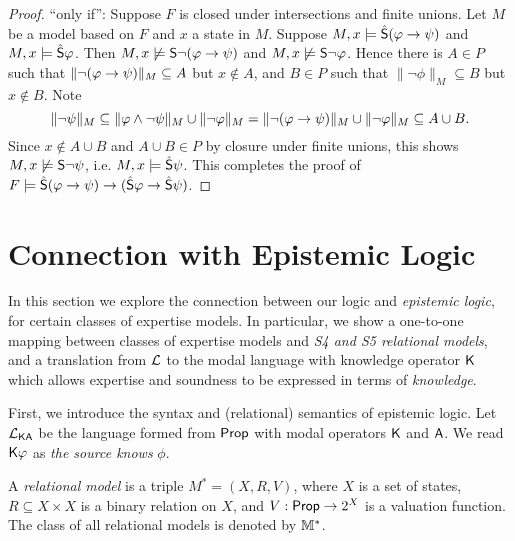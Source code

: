 \begin{proposition}
\begin{proof}
    ``only if'': Suppose $F$ is closed under intersections and finite
    unions. Let $M$ be a model based on $F$ and $x$ a state
    in $M$. Suppose $M, x \models \hat\S(\phi \limplies \psi)$
    and $M, x \models \hat\S\phi$. Then $M, x \not\models
    \S\neg(\phi \limplies \psi)$ and $M, x \not\models \S\neg\phi$.
    Hence there is $A \in P$ such that $\|\neg(\phi \limplies
    \psi)\|_M \subseteq A$ but $x \notin A$, and $B \in P$ such
    that $\|\neg\phi\|_M \subseteq B$ but $x \notin B$. Note
    \[
        \|\neg\psi\|_M
        \subseteq \|\phi \land \neg\psi\|_M \cup \|\neg\phi\|_M
        = \|\neg(\phi \limplies \psi)\|_M \cup \|\neg\phi\|_M
        \subseteq A \cup B.
    \]
    Since $x \notin A \cup B$ and $A \cup B \in P$ by closure
    under finite unions, this shows $M, x \not\models \S\neg\psi$, i.e.
    $M, x \models \hat\S\psi$. This completes the proof of $F
    \models \hat{\S}(\phi \limplies \psi) \limplies (\hat{\S}\phi \limplies
    \hat{\S}\psi)$.
\end{proof}
\end{proposition}

\section{Connection with Epistemic Logic}
\label{exp_sec_connection_with_ep_logic}

In this section we explore the connection between our logic and \emph{epistemic
logic}, for certain classes of expertise models. In particular, we show a
one-to-one mapping between classes of expertise models and \emph{S4 and S5
relational models}, and a translation from $\cL$ to the modal language with
knowledge operator $\K$ which allows expertise and soundness to be expressed in
terms of \emph{knowledge}.

First, we introduce the syntax and (relational) semantics of epistemic logic.
Let $\cLKA$ be the language formed from $\Prop$ with modal operators $\K$ and
$\A$. We read $\K\phi$ as \emph{the source knows} $\phi$.

\begin{definition}
\label{exp_def_relational_models}

    A \emph{relational model} is a triple $M^* = (X, R, V)$, where $X$ is a set
    of states, $R \subseteq X \times X$ is a binary relation on $X$, and $V:
    \Prop \to 2^X$ is a valuation function. The class of all relational models
    is denoted by $\Mrel$.

\end{definition}

